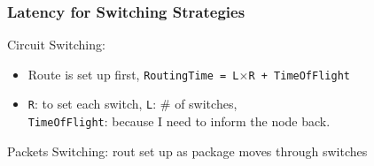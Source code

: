 \documentclass{beamer}
\renewcommand{\emph}[1]{\textcolor{structure}{#1}}
\newcommand{\emp}[1]{\textcolor{DikuRed}{ #1}}
\begin{document}
\begin{frame}[fragile,t]
\frametitle{Latency for Switching Strategies}

\emph{Circuit Switching:}
\begin{itemize}
    \item Route is set up first, \emp{\tt RoutingTime = L$\times$R + TimeOfFlight}
    \item {\tt R}: to set each switch, {\tt L}: \# of switches,\\
          {\tt TimeOfFlight}: because I need to inform the node back.
\end  {itemize}\medskip

\emph{Packets Switching:} rout set up as package moves through switches


\end{frame}
\end{document}
